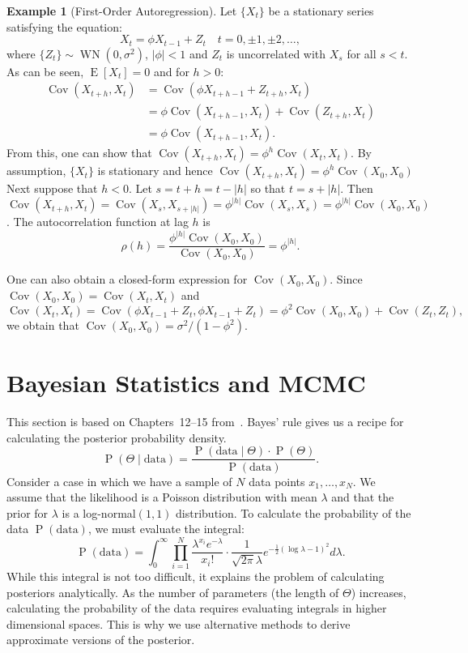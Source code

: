 \documentclass[11pt,a4]{article}
\DeclareMathOperator{\cov}{Cov}
\DeclareMathOperator{\pr}{P}
\DeclareMathOperator{\E}{E}
\DeclareMathOperator{\WN}{WN}
\theoremstyle{definition}
\newtheorem{example}{Example}
\begin{document}
\begin{example}[First-Order Autoregression]
Let $\{ X_t \}$ be a stationary series satisfying the equation:
\begin{equation}
    X_t = \phi X_{t - 1} + Z_t \quad t = 0, \pm 1, \pm 2, \ldots,
\end{equation}
where $\{ Z_t \} \sim \WN(0, \sigma^2)$, $|\phi| < 1$ and $Z_t$ is uncorrelated 
with $X_s$ for all $s < t$. As can be seen, $\E [X_t] = 0$ and for $h > 0$:
\begin{align*}
\cov (X_{t + h}, X_t) 
    & = \cov (\phi X_{t + h - 1} + Z_{t + h}, X_t) \\
    & = \phi \cov (X_{t + h - 1}, X_t) + \cov (Z_{t + h}, X_t) \\
    & = \phi \cov (X_{t + h - 1}, X_t).
\end{align*}
From this, one can show that $\cov (X_{t + h}, X_t) = \phi^h \cov (X_t, X_t)$. 
By assumption, $\{ X_t \}$ is stationary and hence 
$\cov (X_{t + h}, X_t) = \phi^h \cov (X_0, X_0)$
Next suppose that $h < 0$. Let $s = t + h = t - |h|$ so that $t = s + |h|$. 
Then $\cov (X_{t + h}, X_t) = \cov (X_s, X_{s + |h|}) = 
\phi^{|h|} \cov (X_s, X_s) = \phi^{|h|} \cov (X_0, X_0)$. 
The autocorrelation function at lag $h$ is 
\[
    \rho(h) = \frac{ \phi^{|h|}  \cov (X_0, X_0) }{ \cov (X_0, X_0)} = \phi^{|h|}.
\]

One can also obtain a closed-form expression for $\cov (X_0, X_0)$. Since 
$\cov (X_0, X_0) = \cov (X_t, X_t)$ and 
\[
    \cov (X_t, X_t) = \cov (\phi X_{t - 1} + Z_t, \phi X_{t - 1} + Z_t) 
    = \phi^2 \cov (X_0, X_0) + \cov (Z_t, Z_t), 
\]
we obtain that $\cov (X_0, X_0) = \sigma^2 / (1 - \phi^2)$.
\end{example}

\section{Bayesian Statistics and MCMC}
This section is based on Chapters~12--15 from~\cite{Lam}. Bayes' rule gives us a
 recipe for calculating the posterior probability density. 
\begin{equation}
	\pr (\Theta \mid \text{data}) = 
	\frac{\pr (\text{data} \mid \Theta) \cdot \pr (\Theta)}{\pr (\text{data})}.
\end{equation}
Consider a case in which we have a sample of $N$ data points $x_1, \ldots, x_N$. 
We assume that the likelihood is a Poisson distribution with mean $\lambda$ and 
that the prior for $\lambda$ is a log-normal$(1, 1)$ distribution. To calculate 
the probability of the data $\pr (\text{data})$, we must evaluate the integral:
\begin{equation}
	\pr (\text{data}) = \int_{0}^{\infty} 
		\prod_{i = 1}^N \frac{\lambda^{x_i} e^{- \lambda}}{x_i!} \cdot 
		\frac{1}{\sqrt{2 \pi} \lambda} e^{- \frac{1}{2} (\log \lambda - 1)^2} 
		d\lambda.
\end{equation}
While this integral is not too difficult, it explains the problem of calculating 
posteriors analytically. As the number of parameters (the length of $\Theta$) 
increases, calculating the probability of the data requires evaluating integrals 
in higher dimensional spaces. This is why we use alternative methods to derive 
approximate versions of the posterior.
\end{document}
